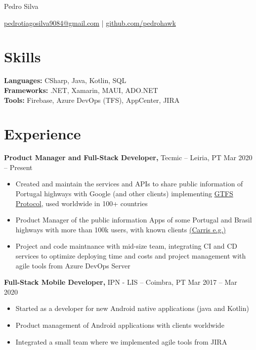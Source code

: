 \documentclass[11pt]{article}       %
\begin{document}
\centerline{\Huge Pedro Silva}

\vspace{5pt}

\centerline{\href{mailto:pedrotiagosilva9084@gmail.com}{pedrotiagosilva9084@gmail.com} | \href{https://github.com/pedrohawk}{github.com/pedrohawk}}

\vspace{-10pt}

\section*{Skills}
\textbf{Languages:} CSharp, Java, Kotlin, SQL \\
\textbf{Frameworks:} .NET, Xamarin, MAUI, ADO.NET \\
\textbf{Tools:} Firebase, Azure DevOps (TFS), AppCenter, JIRA \\

\vspace{-6.5pt}

\section*{Experience}
\textbf{Product Manager and Full-Stack Developer,} {Tecmic} -- Leiria, PT \hfill Mar 2020 -- Present \\
\vspace{-9pt}
\begin{itemize}
  \item Created and maintain the services and APIs to share public information of Portugal highways with Google (and other clients) implementing \href{https://gtfs.org/getting-started/what-is-GTFS/}{GTFS Protocol}, used worldwide in 100+ countries 
  \item Product Manager of the public information Apps of some Portugal and Brasil highways with more than 100k users, with known clients \href{https://play.google.com/store/search?q=carris&c=apps}{(Carris e.g.)}
  \item Project and code maintnance with mid-size team, integrating CI and CD services to optimize deploying time and costs and project management with agile tools from Azure DevOps Server
\end{itemize}

\textbf{Full-Stack Mobile Developer,} {IPN - LIS} -- Coimbra, PT \hfill Mar 2017 -- Mar 2020 \\
\vspace{-9pt}
\begin{itemize}
  \item Started as a developer for new Android native applications (java and Kotlin)
  \item Product management of Android applications with clients worldwide
  \item Integrated a small team where we implemented agile tools from JIRA
\end{itemize}
\end{document}
